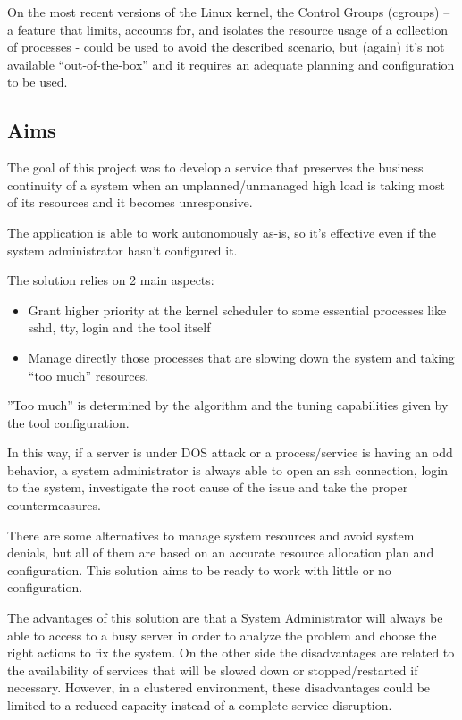 \documentclass[conference]{IEEEtran}
\begin{document}
On the most recent versions of the Linux kernel, the Control Groups (cgroups) \cite{b1} – a feature that limits, accounts for, and isolates the resource usage of a collection of processes - could be used to avoid the described scenario, but (again) it’s not available “out-of-the-box” and it requires an adequate planning and configuration to be used.

\subsection{Aims}
The goal of this project was to develop a service that preserves the business continuity of a system when an unplanned/unmanaged high load is taking most of its resources and it becomes unresponsive.

The application is able to work autonomously as-is, so it’s effective even if the system administrator hasn’t configured it.

The solution relies on 2 main aspects:
\begin{itemize}
\item Grant higher priority at the kernel scheduler to some essential processes like sshd, tty, login and the tool itself
\item Manage directly those processes that are slowing down the system and taking “too much” resources.
\end{itemize}

”Too much” is determined by the algorithm and the tuning capabilities given by the tool configuration.

In this way, if a server is under DOS attack or a process/service is having an odd behavior, a system administrator is always able to open an ssh connection, login to the system, investigate the root cause of the issue and take the proper countermeasures.

There are some alternatives to manage system resources and avoid system denials, but all of them are based on an accurate resource allocation plan and configuration. This solution aims to be ready to work with little or no configuration. 

The advantages of this solution are that a System Administrator will always be able to access to a busy server in order to analyze the problem and choose the right actions to fix the system. On the other side the disadvantages are related to the availability of services that will be slowed down or stopped/restarted if necessary. However, in a clustered environment, these disadvantages could be limited to a reduced capacity instead of a complete service disruption.
\end{document}
